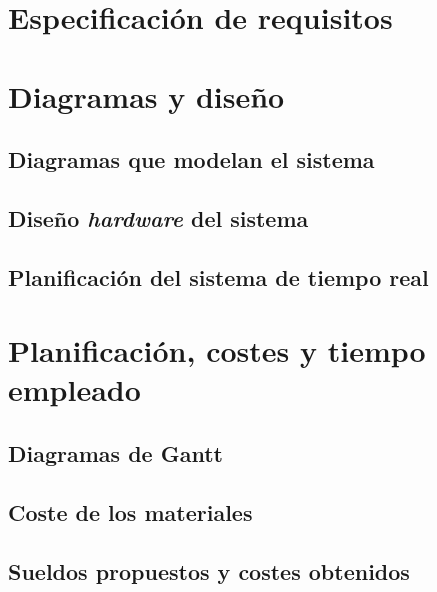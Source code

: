 \chapter{Especificación de requisitos}\label{chap:requirements}


\chapter{Diagramas y diseño}\label{chap:design}

\section{Diagramas que modelan el sistema}\label{sec:sys-diagrams}

\section{Diseño \textit{hardware} del sistema}\label{sec:hardware-design}

\section{Planificación del sistema de tiempo real}\label{sec:rt-design}


\chapter{Planificación, costes y tiempo empleado}\label{chap:planification}
\section{Diagramas de Gantt}
\section{Coste de los materiales}
\section{Sueldos propuestos y costes obtenidos}
